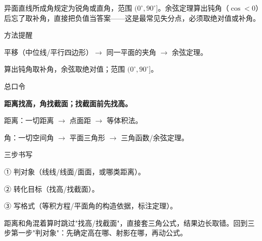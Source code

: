 \documentclass{exam-zh}
\begin{document}
\begin{eduMistakeBox}
异面直线所成角规定为锐角或直角，范围 $(0^\circ,90^\circ]$。余弦定理算出钝角（$\cos<0$）后忘了取补角，直接把负值当答案——这是最常见失分点，必须取绝对值或补角。\end{eduMistakeBox}




\begin{eduSummaryBlock}{\eduIconPin}{方法提醒}
\begin{eduBulletList}
  \item 平移（中位线/平行四边形）$\to$ 同一平面的夹角 $\to$ 余弦定理。  \item 算出钝角取补角，余弦取绝对值；范围 $(0^\circ,90^\circ]$。\end{eduBulletList}
\end{eduSummaryBlock}



\clearpage
{}

\begin{eduBottomGrid}
  \begin{eduSummaryLeft}
    \begin{eduSummaryBlock}{\eduIconCheck}{总口令}
    \begin{eduPlainList}
      \item \textbf{距离找高，角找截面；找截面前先找高。}      \item 距离：一切距离 $\to$ 点面距 $\to$ 等体积法。      \item 角：一切空间角 $\to$ 平面三角形 $\to$ 三角函数/余弦定理。    \end{eduPlainList}
    \end{eduSummaryBlock}
  \end{eduSummaryLeft}
  \eduSummaryDivider
  \begin{eduSummaryRight}
    \begin{eduSummaryBlock}{\eduIconPin}{三步书写}
    \begin{eduBulletList}
      \item ① 判对象（线线/线面/面面，或哪类距离）。      \item ② 转化目标（找高/找截面）。      \item ③ 写格式（等积方程/平面角的构造依据，标注定理）。    \end{eduBulletList}
    \end{eduSummaryBlock}
  \end{eduSummaryRight}
\end{eduBottomGrid}




\begin{eduMistakeBox}
距离和角混着算时跳过"找高/找截面"，直接套三角公式，结果边长取错。回到三步第一步"判对象"：先确定高在哪、射影在哪，再动公式。\end{eduMistakeBox}
\end{document}
